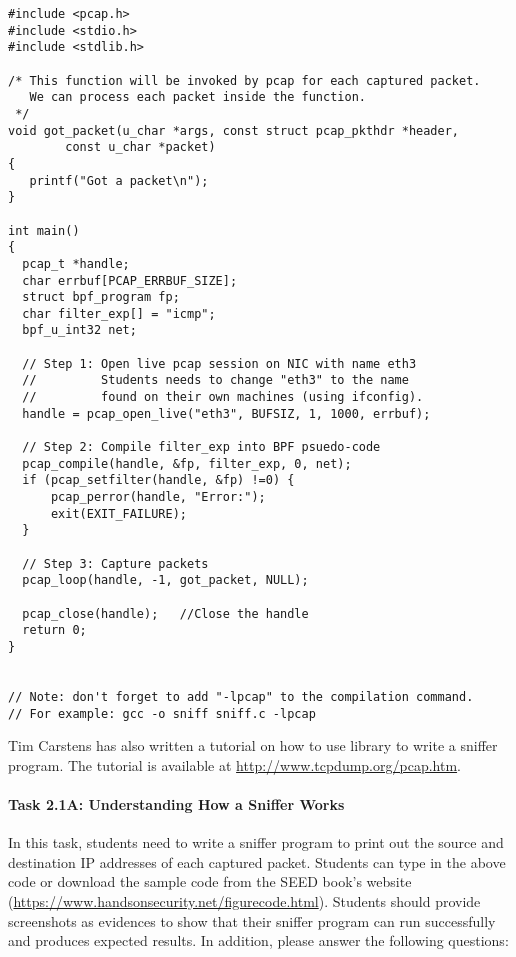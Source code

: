 \begin{lstlisting}
#include <pcap.h>
#include <stdio.h>
#include <stdlib.h>

/* This function will be invoked by pcap for each captured packet.
   We can process each packet inside the function.  
 */
void got_packet(u_char *args, const struct pcap_pkthdr *header,
        const u_char *packet)
{
   printf("Got a packet\n");
}

int main()
{
  pcap_t *handle;
  char errbuf[PCAP_ERRBUF_SIZE];
  struct bpf_program fp;
  char filter_exp[] = "icmp";
  bpf_u_int32 net;

  // Step 1: Open live pcap session on NIC with name eth3
  //         Students needs to change "eth3" to the name 
  //         found on their own machines (using ifconfig).
  handle = pcap_open_live("eth3", BUFSIZ, 1, 1000, errbuf); 

  // Step 2: Compile filter_exp into BPF psuedo-code
  pcap_compile(handle, &fp, filter_exp, 0, net);            
  if (pcap_setfilter(handle, &fp) !=0) {                   
      pcap_perror(handle, "Error:");
      exit(EXIT_FAILURE);
  }

  // Step 3: Capture packets
  pcap_loop(handle, -1, got_packet, NULL);                  

  pcap_close(handle);   //Close the handle
  return 0;
}


// Note: don't forget to add "-lpcap" to the compilation command.
// For example: gcc -o sniff sniff.c -lpcap
\end{lstlisting}


Tim Carstens has also written a tutorial on how to use 
\pcap library to write a sniffer program. The tutorial is 
available at \url{http://www.tcpdump.org/pcap.htm}.  
 

\paragraph{Task 2.1A: Understanding How a Sniffer Works}
In this task, students need to write a sniffer program to 
print out the source and destination IP addresses of each captured 
packet. Students can type in the above code or download the sample code from the 
SEED book's website (\url{https://www.handsonsecurity.net/figurecode.html}). 
Students should provide screenshots as evidences to show that their sniffer
program can run successfully and produces expected 
results. In addition, please answer the following questions:

